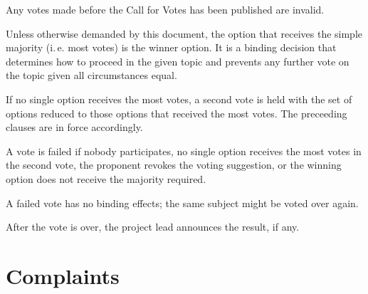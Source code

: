 \documentclass[10pt,a4paper,DIV=calc,headings=medium,twocolumn,draft]{scrartcl}
\newcommand\ie{i.\,e.\xspace}
\begin{document}
\begin{contract}
  Any votes made before the Call for Votes has been published are
  invalid.


  Unless otherwise demanded by this document, the option that receives
  the simple majority (\ie most votes) is the winner option. It is a
  binding decision that determines how to proceed in the given topic
  and prevents any further vote on the topic given all circumstances
  equal.


  If no single option receives the most votes, a second vote is held
  with the set of options reduced to those options that received the
  most votes. The preceeding clauses are in force accordingly.

  \label{failedvote}

  A vote is failed if nobody participates, no single option receives
  the most votes in the second vote, the proponent revokes the
  voting suggestion, or the winning option does not receive the
  majority required.

  A failed vote has no binding effects; the same subject might be
  voted over again.


  After the vote is over, the project lead announces the result, if
  any.
\end{contract}

\section{Complaints}
\end{document}
